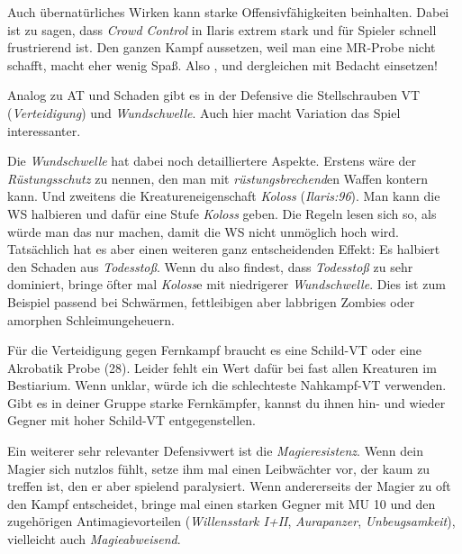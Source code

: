 Auch übernatürliches Wirken kann starke Offensivfähigkeiten beinhalten.
Dabei ist zu sagen, dass \textit{Crowd Control} in Ilaris extrem stark und für Spieler schnell frustrierend ist.
Den ganzen Kampf aussetzen, weil man eine MR-Probe nicht schafft, macht eher wenig Spaß.
Also ,  und dergleichen mit Bedacht einsetzen!

\spaltenende
\begin{center}
\end{center}
\spaltenanfang

Analog zu AT und Schaden gibt es in der Defensive die Stellschrauben VT (\textit{Verteidigung}) und \textit{Wundschwelle}.
Auch hier macht Variation das Spiel interessanter.

Die \textit{Wundschwelle} hat dabei noch detailliertere Aspekte. Erstens wäre der \textit{Rüstungsschutz} zu nennen, den man mit \textit{rüstungsbrechend}en Waffen kontern kann. Und zweitens die Kreatureneigenschaft \textit{Koloss} (\textit{Ilaris:96}). Man kann die WS halbieren und dafür eine Stufe \textit{Koloss} geben. Die Regeln lesen sich so, als würde man das nur machen, damit die WS nicht unmöglich hoch wird. Tatsächlich hat es aber einen weiteren ganz entscheidenden Effekt: Es halbiert den Schaden aus \textit{Todesstoß}. Wenn du also findest, dass \textit{Todesstoß} zu sehr dominiert, bringe öfter mal \textit{Koloss}e mit niedrigerer \textit{Wundschwelle}. Dies ist zum Beispiel passend bei Schwärmen, fettleibigen aber labbrigen Zombies oder amorphen Schleimungeheuern. 
\neuespalte

\mbox{}

\platz

Für die Verteidigung gegen Fernkampf braucht es eine Schild-VT oder eine Akrobatik Probe (28). Leider fehlt ein Wert dafür bei fast allen Kreaturen im Bestiarium. Wenn unklar, würde ich die schlechteste Nahkampf-VT verwenden. Gibt es in deiner Gruppe starke Fernkämpfer, kannst du ihnen hin- und wieder Gegner mit hoher Schild-VT entgegenstellen.

\smallskip

Ein weiterer sehr relevanter Defensivwert ist die \textit{Magieresistenz}.
Wenn dein Magier sich nutzlos fühlt, setze ihm mal einen Leibwächter vor, der kaum zu treffen ist, den er aber spielend paralysiert.
Wenn andererseits der Magier zu oft den Kampf entscheidet, bringe mal einen starken Gegner mit MU 10 und den zugehörigen Antimagievorteilen (\textit{Willensstark I+II}, \textit{Aurapanzer}, \textit{Unbeugsamkeit}), vielleicht auch \textit{Magieabweisend}.



